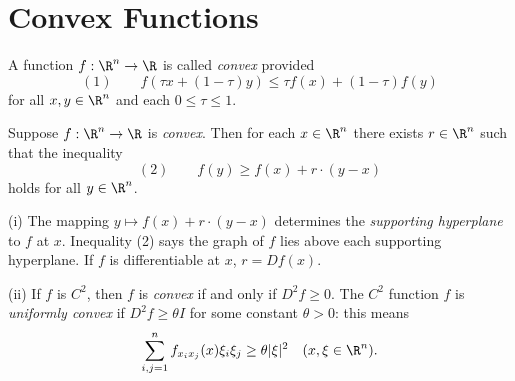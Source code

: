 %
%


\section{Convex Functions}
\label{sec:convex-functions}

\begin{definition}
\label{def:convex-function-rn}
A function $f: \R^n \to \R$ is called \textit{convex} provided
$$(1) \qquad f(\tau x + (1 - \tau)y) \leq \tau f(x) + (1 - \tau)f(y)$$
for all $x, y \in \R^n$ and each $0 \leq \tau \leq 1$.
\end{definition}

\begin{theorem}
\label{thm:supporting-hyperplanes}
Suppose $f: \R^n \to \R$ is \textit{convex}. Then for each $x \in \R^n$ there exists $r \in \R^n$ such that the inequality
$$(2) \qquad f(y) \geq f(x) + r \cdot (y - x)$$
holds for all $y \in \R^n$.
\end{theorem}

\begin{remark}
\label{rem:supporting-hyperplane-remarks}
(i) The mapping $y \mapsto f(x) + r \cdot (y - x)$ determines the \textit{supporting hyperplane} to $f$ at $x$. Inequality (2) says the graph of $f$ lies above each supporting hyperplane. If $f$ is differentiable at $x$, $r = Df(x)$.

(ii) If $f$ is $C^2$, then $f$ is \textit{convex} if and only if $D^2f \geq 0$. The $C^2$ function $f$ is \textit{uniformly convex} if $D^2f \geq \theta I$ for some constant $\theta > 0$: this means
$$\sum_{i,j=1}^{n} f_{x_i x_j}(x) \xi_i \xi_j \geq \theta |\xi|^2 \quad (x, \xi \in \R^n).$$
\end{remark}

